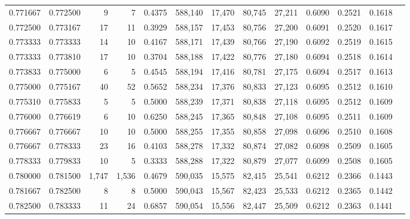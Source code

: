 \begin{tabular}{rrrrrrrrrrrrr}
0.771667 & 0.772500 &      9 &     7 &                                     0.4375 & 588,140 &  17,470 &  80,745 &  27,211 & 0.6090 & 0.2521 & 0.1618 \\
0.772500 & 0.773167 &     17 &    11 &                                     0.3929 & 588,157 &  17,453 &  80,756 &  27,200 & 0.6091 & 0.2520 & 0.1617 \\
0.773333 & 0.773333 &     14 &    10 &                                     0.4167 & 588,171 &  17,439 &  80,766 &  27,190 & 0.6092 & 0.2519 & 0.1615 \\
0.773333 & 0.773810 &     17 &    10 &                                     0.3704 & 588,188 &  17,422 &  80,776 &  27,180 & 0.6094 & 0.2518 & 0.1614 \\
0.773833 & 0.775000 &      6 &     5 &                                     0.4545 & 588,194 &  17,416 &  80,781 &  27,175 & 0.6094 & 0.2517 & 0.1613 \\
0.775000 & 0.775167 &     40 &    52 &                                     0.5652 & 588,234 &  17,376 &  80,833 &  27,123 & 0.6095 & 0.2512 & 0.1610 \\
0.775310 & 0.775833 &      5 &     5 &                                     0.5000 & 588,239 &  17,371 &  80,838 &  27,118 & 0.6095 & 0.2512 & 0.1609 \\
0.776000 & 0.776619 &      6 &    10 &                                     0.6250 & 588,245 &  17,365 &  80,848 &  27,108 & 0.6095 & 0.2511 & 0.1609 \\
0.776667 & 0.776667 &     10 &    10 &                                     0.5000 & 588,255 &  17,355 &  80,858 &  27,098 & 0.6096 & 0.2510 & 0.1608 \\
0.776667 & 0.778333 &     23 &    16 &                                     0.4103 & 588,278 &  17,332 &  80,874 &  27,082 & 0.6098 & 0.2509 & 0.1605 \\
0.778333 & 0.779833 &     10 &     5 &                                     0.3333 & 588,288 &  17,322 &  80,879 &  27,077 & 0.6099 & 0.2508 & 0.1605 \\
0.780000 & 0.781500 &  1,747 & 1,536 &                                     0.4679 & 590,035 &  15,575 &  82,415 &  25,541 & 0.6212 & 0.2366 & 0.1443 \\
0.781667 & 0.782500 &      8 &     8 &                                     0.5000 & 590,043 &  15,567 &  82,423 &  25,533 & 0.6212 & 0.2365 & 0.1442 \\
0.782500 & 0.783333 &     11 &    24 &                                     0.6857 & 590,054 &  15,556 &  82,447 &  25,509 & 0.6212 & 0.2363 & 0.1441 \\

\end{tabular}
